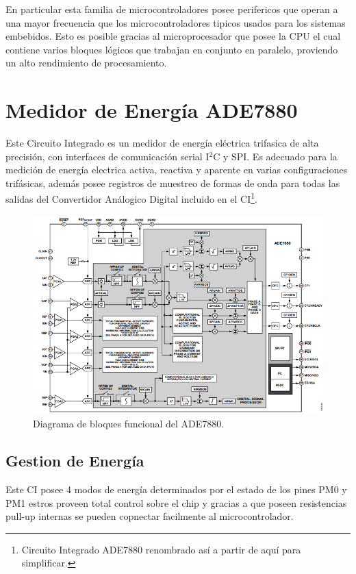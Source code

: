 \documentclass[letterpaper,12pt,oneside]{book}
\begin{document}
		En particular esta familia de microcontroladores posee perifericos que operan a una mayor frecuencia que los microcontroladores tipicos usados para los sistemas embebidos. Esto es posible gracias al microprocesador que posee la CPU el cual contiene varios bloques lógicos que trabajan en conjunto en paralelo, proviendo un alto rendimiento de procesamiento.
		\section{Medidor de Energía ADE7880}
		Este Circuito Integrado es un medidor de energía eléctrica trifasica de alta precisión, con interfaces de comunicación serial I$^2$C y SPI. Es adecuado para la medición de energía electrica activa, reactiva y aparente en varias configuraciones trifásicas, además posee registros de muestreo de formas de onda para todas las salidas del Convertidor Análogico Digital incluido en el CI\footnote{Circuito Integrado ADE7880 renombrado así a partir de aquí para simplificar.}.

		\begin{figure}[!htpb]
			\centering
			\includegraphics[scale = 0.8]{Material de Consulta/ADE7880FuncDiag.PNG}
			\caption[Diagrama de Bloques del ADE7880]{Diagrama de bloques funcional del ADE7880.}
			\label{FuncDiag}
		\end{figure}

			\subsection{Gestion de Energía}
			Este CI posee 4 modos de energía determinados por el estado de los pines PM0 y PM1 estros proveen total control sobre el chip y gracias a que poseen resistencias pull-up internas se pueden copnectar facilmente al microcontrolador.
\end{document}

